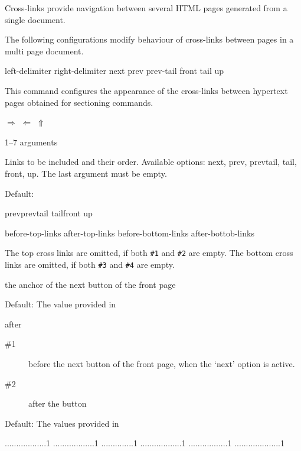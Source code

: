 \documentclass{book}
\begin{document}
Cross-links provide navigation between several HTML pages generated from a single document.

The following configurations modify behaviour of cross-links between pages in a multi page document.

 {left-delimiter} {right-delimiter} {next} {prev} {prev-tail} {front} {tail} {up}\EndDoc

This command configures the appearance of the cross-links between hypertext pages obtained for sectioning commands.

\begin{texsource}
   {}{}{$\scriptstyle\Rightarrow$}
   {$\scriptstyle\Leftarrow$}
   {}{}{}{$\scriptstyle\Uparrow$}
\end{texsource}

 {1--7 arguments}\EndDoc

  Links to be included and their order. Available
  options: next, prev, prevtail, tail, front, up.
  The last argument must be empty.

  Default:

\begin{texsource}
   {prev}{prevtail}
   {tail}{front}
   {up}{}
\end{texsource}

 {before-top-links} {after-top-links} {before-bottom-links} {after-bottob-links}\EndDoc

The top cross links are omitted, if both \verb|#1| and \verb|#2| are empty.
The bottom cross links are omitted, if both \verb|#3| and \verb|#4| are empty.

 {the anchor of the next button of the front page}\EndDoc

Default: The value provided in 

 {after}\EndDoc

\begin{description}
  \item[\#1]  before the next button of the front page, when the `next'
       option is active.
  \item[\#2]  after the button
\end{description}

    Default: The values provided in 

\begin{texsource}
..................1
..................1
..............1
..................1
.................1
....................1
\end{texsource}
\end{document}
